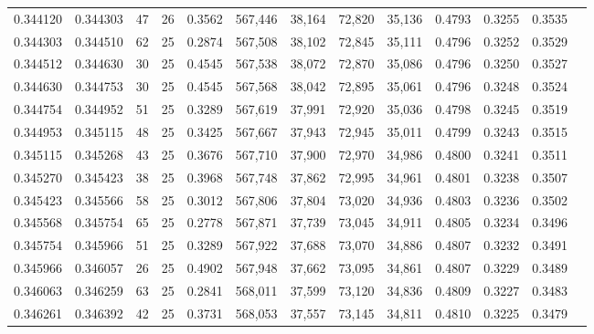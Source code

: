 \begin{tabular}{rrrrrrrrrrrrr}
0.344120 & 0.344303 &    47 &  26 &                                     0.3562 & 567,446 &  38,164 &  72,820 &  35,136 & 0.4793 & 0.3255 & 0.3535 \\
0.344303 & 0.344510 &    62 &  25 &                                     0.2874 & 567,508 &  38,102 &  72,845 &  35,111 & 0.4796 & 0.3252 & 0.3529 \\
0.344512 & 0.344630 &    30 &  25 &                                     0.4545 & 567,538 &  38,072 &  72,870 &  35,086 & 0.4796 & 0.3250 & 0.3527 \\
0.344630 & 0.344753 &    30 &  25 &                                     0.4545 & 567,568 &  38,042 &  72,895 &  35,061 & 0.4796 & 0.3248 & 0.3524 \\
0.344754 & 0.344952 &    51 &  25 &                                     0.3289 & 567,619 &  37,991 &  72,920 &  35,036 & 0.4798 & 0.3245 & 0.3519 \\
0.344953 & 0.345115 &    48 &  25 &                                     0.3425 & 567,667 &  37,943 &  72,945 &  35,011 & 0.4799 & 0.3243 & 0.3515 \\
0.345115 & 0.345268 &    43 &  25 &                                     0.3676 & 567,710 &  37,900 &  72,970 &  34,986 & 0.4800 & 0.3241 & 0.3511 \\
0.345270 & 0.345423 &    38 &  25 &                                     0.3968 & 567,748 &  37,862 &  72,995 &  34,961 & 0.4801 & 0.3238 & 0.3507 \\
0.345423 & 0.345566 &    58 &  25 &                                     0.3012 & 567,806 &  37,804 &  73,020 &  34,936 & 0.4803 & 0.3236 & 0.3502 \\
0.345568 & 0.345754 &    65 &  25 &                                     0.2778 & 567,871 &  37,739 &  73,045 &  34,911 & 0.4805 & 0.3234 & 0.3496 \\
0.345754 & 0.345966 &    51 &  25 &                                     0.3289 & 567,922 &  37,688 &  73,070 &  34,886 & 0.4807 & 0.3232 & 0.3491 \\
0.345966 & 0.346057 &    26 &  25 &                                     0.4902 & 567,948 &  37,662 &  73,095 &  34,861 & 0.4807 & 0.3229 & 0.3489 \\
0.346063 & 0.346259 &    63 &  25 &                                     0.2841 & 568,011 &  37,599 &  73,120 &  34,836 & 0.4809 & 0.3227 & 0.3483 \\
0.346261 & 0.346392 &    42 &  25 &                                     0.3731 & 568,053 &  37,557 &  73,145 &  34,811 & 0.4810 & 0.3225 & 0.3479 \\

\end{tabular}
